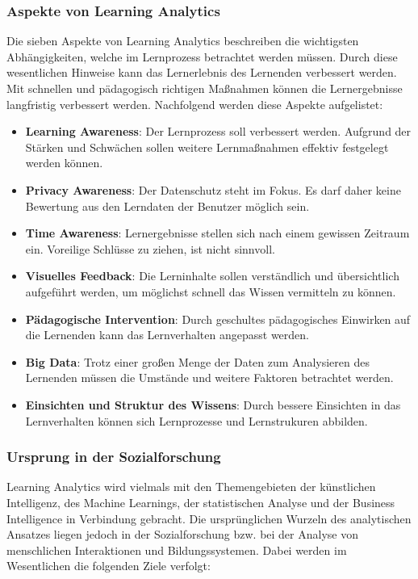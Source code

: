 \subsubsection{Aspekte von Learning Analytics}
Die sieben Aspekte von Learning Analytics\autocite[Vgl.][S. 46 ff.]{EJ-LearningAnalytics} beschreiben die wichtigsten Abhängigkeiten, welche im Lernprozess betrachtet werden müssen. 
Durch diese wesentlichen Hinweise kann das Lernerlebnis des Lernenden verbessert werden. 
Mit schnellen und pädagogisch richtigen Maßnahmen können die Lernergebnisse langfristig verbessert werden. 
Nachfolgend werden diese Aspekte aufgelistet:
% 
\begin{itemize}
    \item \textbf{Learning Awareness}: Der Lernprozess soll verbessert werden. Aufgrund der Stärken und Schwächen sollen weitere Lernmaßnahmen effektiv festgelegt werden können.
    \item \textbf{Privacy Awareness}: Der Datenschutz steht im Fokus. Es darf daher keine Bewertung aus den Lerndaten der Benutzer möglich sein.
    \item \textbf{Time Awareness}: Lernergebnisse stellen sich nach einem gewissen Zeitraum ein. Voreilige Schlüsse zu ziehen, ist nicht sinnvoll.
    \item \textbf{Visuelles Feedback}: Die Lerninhalte sollen verständlich und übersichtlich aufgeführt werden, um möglichst schnell das Wissen vermitteln zu können.
    \item \textbf{Pädagogische Intervention}: Durch geschultes pädagogisches Einwirken auf die Lernenden kann das Lernverhalten angepasst werden.
    \item \textbf{Big Data}: Trotz einer großen Menge der Daten zum Analysieren des Lernenden müssen die Umstände und weitere Faktoren betrachtet werden.
    \item \textbf{Einsichten und Struktur des Wissens}: Durch bessere Einsichten in das Lernverhalten können sich Lernprozesse und Lernstrukuren abbilden.
\end{itemize}
% 
\subsubsection{Ursprung in der Sozialforschung}

Learning Analytics wird vielmals mit den Themengebieten der künstlichen Intelligenz, des Machine Learnings, der statistischen Analyse und der Business Intelligence in Verbindung gebracht.
Die ursprünglichen Wurzeln des analytischen Ansatzes liegen jedoch in der Sozialforschung bzw. bei der Analyse von menschlichen Interaktionen und Bildungssystemen.\autocite[Vgl.][S. 1383]{ej-GeorgeSiemens}
Dabei werden im Wesentlichen die folgenden Ziele verfolgt:\autocite[Vgl.][ab Minute 11]{ej-GeorgSiemensVideo}

